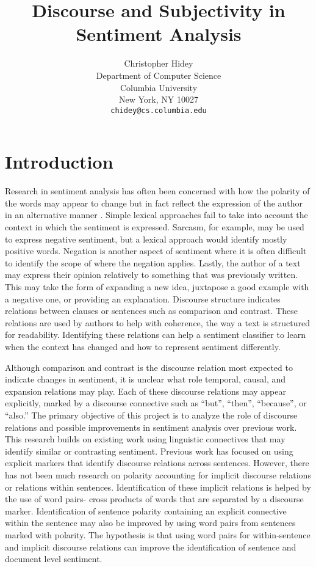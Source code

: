 \documentclass[11pt,letterpaper]{article}
\title{Discourse and Subjectivity in Sentiment Analysis}
\author{Christopher Hidey \\
Department of Computer Science \\
Columbia University \\
New York, NY 10027 \\
{\tt chidey@cs.columbia.edu} \\
}
\begin{document}
\maketitle

\section{Introduction}
Research in sentiment analysis has often been concerned with how the polarity of the words may appear to change but in fact reflect the expression of the author 
in an alternative manner \cite{Lee}. Simple lexical approaches fail to take into account the context in which the sentiment is expressed. Sarcasm, for example, may be used to express negative sentiment, but a lexical approach would identify mostly positive words. Negation is another aspect of sentiment where it is often difficult to identify the scope of where the negation applies.
Lastly, the author of a text may express their opinion relatively to something that was previously written.  This may take the form of expanding a new idea, juxtapose a good example with a negative one, or providing an explanation.  Discourse structure indicates relations between clauses or sentences such as comparison and contrast.  These relations are used by authors to help with coherence, the way a text is structured for readability.  Identifying these relations can help a sentiment classifier to learn when the context has changed and how to represent sentiment differently.

Although comparison and contrast is the discourse relation most expected to indicate changes in sentiment,
it is unclear what role temporal, causal, and expansion relations may play.  Each of these discourse relations
may appear explicitly, marked by a discourse connective such as ``but'', ``then'', ``because'', or ``also.''
The primary objective of this
project is to analyze the role of discourse relations and possible improvements in sentiment analysis
over previous work.
This research builds on 
existing work using linguistic connectives
that may identify similar or contrasting sentiment. Previous work has focused on using explicit markers
that identify discourse relations across sentences.  However, there has not been much research on
polarity accounting for implicit discourse relations or relations within sentences.
Identification of these implicit relations is helped by 
the use of word pairs- cross products of words that are separated by a discourse marker.  
Identification of sentence polarity containing an explicit connective within the sentence may also
be improved by using word pairs from sentences marked with polarity.
The hypothesis is that using word pairs for within-sentence and implicit discourse relations can improve
the identification of sentence and document level sentiment.
\end{document}
